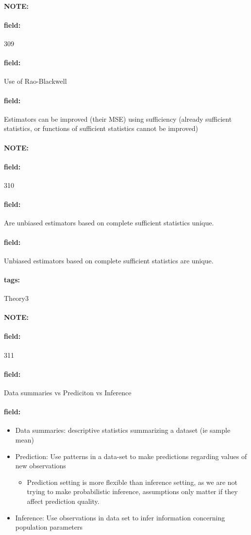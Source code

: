 \documentclass[12pt]{article}
\newenvironment{note}{\paragraph{NOTE:}}{}
\newenvironment{field}{\paragraph{field:}}{}
\newcommand*{\tags}[1]{\paragraph{tags: }#1}
\begin{document}
\begin{note} \begin{field} \tiny 309 \end{field}
  \begin{field}
    Use of Rao-Blackwell
  \end{field}
  \begin{field}
    Estimators can be improved (their MSE) using sufficiency (already sufficient statistics, or functions of sufficient statistics cannot be improved)
  \end{field}
\end{note}

\begin{note} \begin{field} \tiny 310 \end{field}
  \begin{field}
    Are unbiased estimators based on complete sufficient statistics unique.
  \end{field}
  \begin{field}
    Unbiased estimators based on complete sufficient statistics are unique.
  \end{field}
\end{note}


\tags{Theory3}

\begin{note}
    \begin{field}
        \tiny 311
    \end{field}
    \begin{field}
        Data summaries vs Prediciton vs Inference
    \end{field}
    \begin{field}
        \begin{itemize}
          \item Data summaries: descriptive statistics summarizing a dataset (ie sample mean)
          \item Prediction: Use patterns in a data-set to make predictions regarding values of new observations
          \begin{itemize}
            \item Prediction setting is more flexible than inference setting, as we are not trying to make probabilistic inference, assumptions only matter if they affect prediction quality.
          \end{itemize}
          \item Inference: Use observations in data set to infer information concerning population parameters
        \end{itemize}
    \end{field}
\end{note}
\end{document}
